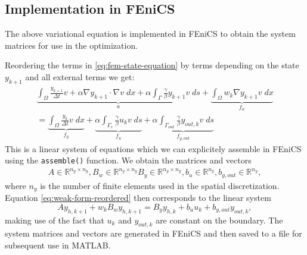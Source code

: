 \documentclass[
12pt, %
a4paper, %
onecolumn, %
portrait %
]{article}
\begin{document}
\subsection{Implementation in FEniCS}
The above variational equation is implemented in FEniCS to obtain the system matrices for use in the optimization.

Reordering the terms in \eqref{eq:fem-state-equation} by terms depending on the state $y_{k+1}$ and all external terms we get:
\begin{equation}
\begin{aligned}
\underbrace{\int_{\Omega} \frac{y_{k+1}}{\Delta t} v + \alpha \nabla y_{k+1} \cdot \nabla v \; dx + \alpha \int_{\Gamma} \frac{\gamma}{\beta}  y_{k+1} v \; ds}_{a} + \underbrace{\int_{\Omega} w_{k} \nabla y_{k+1} v \; dx}_{f_w} \\
= \underbrace{\int_{\Omega} \frac{y_k}{\Delta t} v \; dx}_{f_y} + \underbrace{\alpha \int_{\Gamma_c} \frac{\gamma}{\beta}  u_k v \; ds}_{f_u}  +  \underbrace{\alpha\int_{\Gamma_{out}} \frac{ \gamma}{\beta}  y_{out,k} v \; ds}_{f_{y,out}}
\label{eq:weak-form-reordered}
\end{aligned}
\end{equation}
This is a linear system of equations which we can explicitely assemble in FEniCS using the \texttt{assemble()} function. We obtain the matrices and vectors
\begin{align*}
A \in \mathbb{R}^{n_y \times n_y}, B_w \in \mathbb{R}^{n_y \times n_y} B_y \in \mathbb{R}^{n_y \times n_y}, b_u \in \mathbb{R}^{n_y}, b_{y,out} \in \mathbb{R}^{n_y},
\end{align*}
where $n_y$ is the number of finite elements used in the spatial discretization.
Equation \eqref{eq:weak-form-reordered} then corresponds to the linear system
\begin{equation}
A y_{h,k+1} + w_k B_w y_{h,k+1} = B_y y_{h,k} + b_u u_k + b_{y,out} y_{out,k},
\end{equation}
making use of the fact that $u_k$ and $y_{out,k}$ are constant on the boundary. The system matrices and vectors are generated in FEniCS and then saved to a file for subsequent use in MATLAB.
\end{document}
